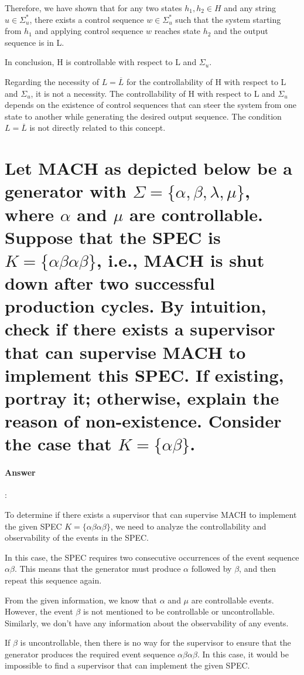 \documentclass{article}
\begin{document}
Therefore, we have shown that for any two states $h_1, h_2 \in H$ and any string $u \in \Sigma_u^*$, there exists a control sequence $w \in \Sigma_u^*$ such that the system starting from $h_1$ and applying control sequence $w$ reaches state $h_2$ and the output sequence is in L.

In conclusion, H is controllable with respect to L and $\Sigma_u$.

Regarding the necessity of $L = \overline{L}$ for the controllability of H with respect to L and $\Sigma_u$, it is not a necessity. The controllability of H with respect to L and $\Sigma_u$ depends on the existence of control sequences that can steer the system from one state to another while generating the desired output sequence. The condition $L = \overline{L}$ is not directly related to this concept.

\section{Let MACH as depicted below be a generator with $\Sigma = \{\alpha , \beta , \lambda , \mu \}$, where $\alpha$ and $\mu$ are controllable. Suppose that the SPEC is $K = \{\alpha\beta\alpha\beta\}$, i.e., MACH is shut down after two successful production cycles. By intuition, check if there exists a supervisor that can supervise MACH to implement this SPEC. If existing, portray it; otherwise, explain the reason of non-existence. Consider the case that $K = \{\alpha\beta\}$.}

\paragraph{Answer}:

To determine if there exists a supervisor that can supervise MACH to implement the given SPEC $K = \{\alpha\beta\alpha\beta\}$, we need to analyze the controllability and observability of the events in the SPEC.

In this case, the SPEC requires two consecutive occurrences of the event sequence $\alpha\beta$. This means that the generator must produce $\alpha$ followed by $\beta$, and then repeat this sequence again.

From the given information, we know that $\alpha$ and $\mu$ are controllable events. However, the event $\beta$ is not mentioned to be controllable or uncontrollable. Similarly, we don't have any information about the observability of any events.

If $\beta$ is uncontrollable, then there is no way for the supervisor to ensure that the generator produces the required event sequence $\alpha\beta\alpha\beta$. In this case, it would be impossible to find a supervisor that can implement the given SPEC.
\end{document}
